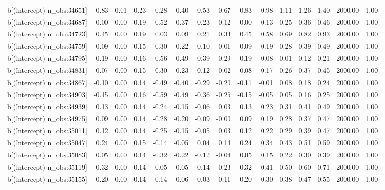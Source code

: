 \begin{table}[ht]
\begin{tabular}{rrrrrrrrrrrrrrr}
  b[(Intercept) n\_obs:34651] & 0.83 & 0.01 & 0.23 & 0.28 & 0.40 & 0.53 & 0.67 & 0.83 & 0.98 & 1.11 & 1.26 & 1.40 & 2000.00 & 1.00 \\ 
  b[(Intercept) n\_obs:34687] & 0.00 & 0.00 & 0.19 & -0.52 & -0.37 & -0.23 & -0.12 & -0.00 & 0.13 & 0.25 & 0.36 & 0.46 & 2000.00 & 1.00 \\ 
  b[(Intercept) n\_obs:34723] & 0.45 & 0.00 & 0.19 & -0.03 & 0.09 & 0.21 & 0.33 & 0.45 & 0.58 & 0.69 & 0.82 & 0.93 & 2000.00 & 1.00 \\ 
  b[(Intercept) n\_obs:34759] & 0.09 & 0.00 & 0.15 & -0.30 & -0.22 & -0.10 & -0.01 & 0.09 & 0.19 & 0.28 & 0.39 & 0.49 & 2000.00 & 1.00 \\ 
  b[(Intercept) n\_obs:34795] & -0.19 & 0.00 & 0.16 & -0.56 & -0.49 & -0.39 & -0.29 & -0.19 & -0.08 & 0.01 & 0.12 & 0.21 & 2000.00 & 1.00 \\ 
  b[(Intercept) n\_obs:34831] & 0.07 & 0.00 & 0.15 & -0.30 & -0.23 & -0.12 & -0.02 & 0.08 & 0.17 & 0.26 & 0.37 & 0.45 & 2000.00 & 1.00 \\ 
  b[(Intercept) n\_obs:34867] & -0.10 & 0.00 & 0.14 & -0.49 & -0.40 & -0.29 & -0.20 & -0.11 & -0.01 & 0.08 & 0.18 & 0.24 & 2000.00 & 1.00 \\ 
  b[(Intercept) n\_obs:34903] & -0.15 & 0.00 & 0.16 & -0.59 & -0.49 & -0.36 & -0.26 & -0.15 & -0.05 & 0.05 & 0.16 & 0.25 & 2000.00 & 1.00 \\ 
  b[(Intercept) n\_obs:34939] & 0.13 & 0.00 & 0.14 & -0.24 & -0.15 & -0.06 & 0.03 & 0.13 & 0.23 & 0.31 & 0.41 & 0.49 & 2000.00 & 1.00 \\ 
  b[(Intercept) n\_obs:34975] & 0.09 & 0.00 & 0.14 & -0.28 & -0.20 & -0.09 & -0.00 & 0.09 & 0.19 & 0.28 & 0.37 & 0.47 & 2000.00 & 1.00 \\ 
  b[(Intercept) n\_obs:35011] & 0.12 & 0.00 & 0.14 & -0.25 & -0.15 & -0.05 & 0.03 & 0.12 & 0.22 & 0.29 & 0.39 & 0.47 & 2000.00 & 1.00 \\ 
  b[(Intercept) n\_obs:35047] & 0.24 & 0.00 & 0.15 & -0.14 & -0.05 & 0.04 & 0.14 & 0.24 & 0.34 & 0.43 & 0.51 & 0.59 & 2000.00 & 1.00 \\ 
  b[(Intercept) n\_obs:35083] & 0.05 & 0.00 & 0.14 & -0.32 & -0.22 & -0.12 & -0.04 & 0.05 & 0.15 & 0.22 & 0.30 & 0.39 & 2000.00 & 1.00 \\ 
  b[(Intercept) n\_obs:35119] & 0.32 & 0.00 & 0.14 & -0.05 & 0.05 & 0.14 & 0.23 & 0.32 & 0.41 & 0.50 & 0.60 & 0.71 & 2000.00 & 1.00 \\ 
  b[(Intercept) n\_obs:35155] & 0.20 & 0.00 & 0.14 & -0.14 & -0.06 & 0.03 & 0.11 & 0.20 & 0.30 & 0.38 & 0.47 & 0.55 & 2000.00 & 1.00 \\ 

\end{tabular}
\end{table}
